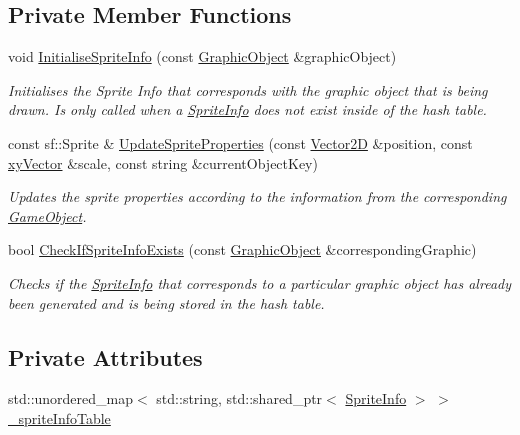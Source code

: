 \subsection*{Private Member Functions}
\begin{DoxyCompactItemize}
\item 
void \hyperlink{class_update_game_object_display_ab9405bbbabaa083cfdaefbbe84cb7cd4}{Initialise\+Sprite\+Info} (const \hyperlink{class_graphic_object}{Graphic\+Object} \&graphic\+Object)
\begin{DoxyCompactList}\small\item\em Initialises the Sprite Info that corresponds with the graphic object that is being drawn. Is only called when a \hyperlink{struct_sprite_info}{Sprite\+Info} does not exist inside of the hash table. \end{DoxyCompactList}\item 
const sf\+::\+Sprite \& \hyperlink{class_update_game_object_display_a05f0b24dfb3e2206b0d363dbc5127139}{Update\+Sprite\+Properties} (const \hyperlink{class_vector2_d}{Vector2D} \&position, const \hyperlink{structxy_vector}{xy\+Vector} \&scale, const string \&current\+Object\+Key)
\begin{DoxyCompactList}\small\item\em Updates the sprite properties according to the information from the corresponding \hyperlink{class_game_object}{Game\+Object}. \end{DoxyCompactList}\item 
bool \hyperlink{class_update_game_object_display_a10502ed4d422e5bab6b5f3591d392c55}{Check\+If\+Sprite\+Info\+Exists} (const \hyperlink{class_graphic_object}{Graphic\+Object} \&corresponding\+Graphic)
\begin{DoxyCompactList}\small\item\em Checks if the \hyperlink{struct_sprite_info}{Sprite\+Info} that corresponds to a particular graphic object has already been generated and is being stored in the hash table. \end{DoxyCompactList}\end{DoxyCompactItemize}
\subsection*{Private Attributes}
\begin{DoxyCompactItemize}
\item 
std\+::unordered\+\_\+map$<$ std\+::string, std\+::shared\+\_\+ptr$<$ \hyperlink{struct_sprite_info}{Sprite\+Info} $>$ $>$ \hyperlink{class_update_game_object_display_a51ae3f07958294b737885c9a0bd86153}{\+\_\+sprite\+Info\+Table}
\end{DoxyCompactItemize}


